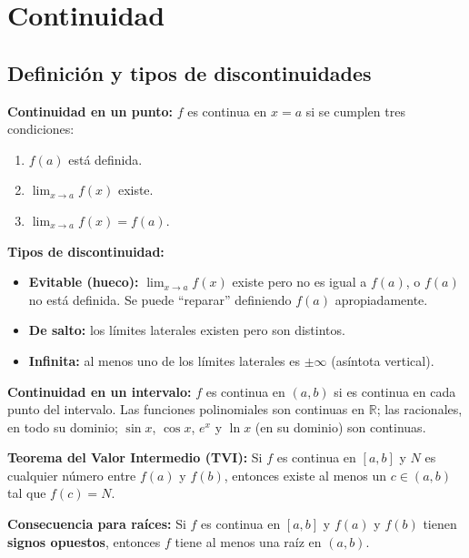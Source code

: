\documentclass[12pt, a4paper]{article}
\begin{document}
\newpage

\section{Continuidad}

\subsection{Definición y tipos de discontinuidades}

\begin{cuadroteoria}
  \textbf{Continuidad en un punto:} $f$ es continua en $x = a$ si se cumplen tres condiciones:
  \begin{enumerate}
    \item $f(a)$ está definida.
    \item $\lim_{x \to a} f(x)$ existe.
    \item $\lim_{x \to a} f(x) = f(a)$.
  \end{enumerate}
\end{cuadroteoria}

\begin{cuadrosolucion}
  \textbf{Tipos de discontinuidad:}
  \begin{itemize}[leftmargin=*]
    \item \textbf{Evitable (hueco):} $\lim_{x \to a} f(x)$ existe pero no es igual a $f(a)$, o $f(a)$ no está definida. Se puede ``reparar'' definiendo $f(a)$ apropiadamente.
    \item \textbf{De salto:} los límites laterales existen pero son distintos.
    \item \textbf{Infinita:} al menos uno de los límites laterales es $\pm\infty$ (asíntota vertical).
  \end{itemize}
\end{cuadrosolucion}

\begin{cuadroadvertencia}
  \textbf{Continuidad en un intervalo:} $f$ es continua en $(a, b)$ si es continua en cada punto del intervalo. Las funciones polinomiales son continuas en $\mathbb{R}$; las racionales, en todo su dominio; $\sin x$, $\cos x$, $e^x$ y $\ln x$ (en su dominio) son continuas.
\end{cuadroadvertencia}

\begin{cuadroextra}
  \textbf{Teorema del Valor Intermedio (TVI):} Si $f$ es continua en $[a, b]$ y $N$ es cualquier número entre $f(a)$ y $f(b)$, entonces existe al menos un $c \in (a, b)$ tal que $f(c) = N$.

  \textbf{Consecuencia para raíces:} Si $f$ es continua en $[a, b]$ y $f(a)$ y $f(b)$ tienen \textbf{signos opuestos}, entonces $f$ tiene al menos una raíz en $(a, b)$.
\end{cuadroextra}
\end{document}
